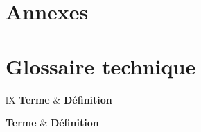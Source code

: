 \newpage
\appendix
\section*{Annexes}

\section{Glossaire technique}
\label{annex:glossaire}

\begin{xltabular}{\textwidth}{lX}
    \toprule
    \textbf{Terme} & \textbf{Définition} \\
    \midrule
    \endfirsthead

    \toprule
    \textbf{Terme} & \textbf{Définition} \\
    \midrule
    \endhead

    \bottomrule
    \endfoot


\end{xltabular}
